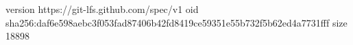 version https://git-lfs.github.com/spec/v1
oid sha256:daf6e598aebc3f053fad87406b42fd8419ce59351e55b732f5b62ed4a7731fff
size 18898
